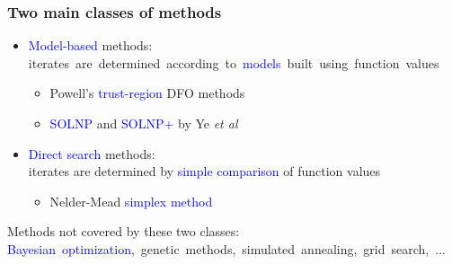 \documentclass[slidestop,mathserif,xcolor=dvipsnames]{beamer}
\newcommand{\blue}[1]{\textcolor{blue}{#1}}
\begin{document}
\begin{frame}
    \frametitle{Two main classes of methods}
   \vspace{1ex}

    \begin{itemize}
        \item \blue{Model-based} methods: \\
            \mbox{iterates are determined according to \blue{models} built using function values}%
          \vspace{1ex}

          \begin{itemize}
              \item Powell's \blue{trust-region} DFO methods\\[1ex]
            \item \blue{SOLNP} and \blue{SOLNP+} by Ye \textit{et al}%
          \end{itemize}
 \vspace{1ex}

 \item \blue{Direct search} methods: \\
     iterates are determined by \blue{simple comparison} of function values%

   \vspace{1ex}

   \begin{itemize}
       \item Nelder-Mead \blue{simplex method}
   \end{itemize}
    \end{itemize}

    \vspace{1.5ex}

   Methods not covered by these two classes: \\[0.5ex]
    \mbox{\blue{Bayesian optimization}, genetic methods, simulated annealing, grid search, ...}
\end{frame}
\end{document}
